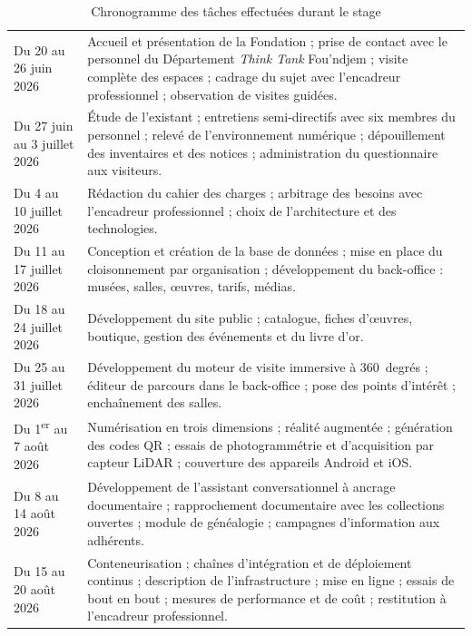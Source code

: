 \begin{table}[!ht]
\centering
\caption{Chronogramme des tâches effectuées durant le stage}
\label{tab:chronogramme}
\footnotesize
\begin{tabularx}{\textwidth}{|L{3.4cm}|X|}
\hline
{}
 &  \\ \hline
Du 20 au 26 juin 2026 &
Accueil et présentation de la Fondation ; prise de contact avec le personnel du
Département \emph{Think Tank} Fou'ndjem ; visite complète des espaces ; cadrage
du sujet avec l'encadreur professionnel ; observation de visites guidées. \\ \hline
Du 27 juin au 3 juillet 2026 &
Étude de l'existant ; entretiens semi-directifs avec six membres du personnel ;
relevé de l'environnement numérique ; dépouillement des inventaires et des
notices ; administration du questionnaire aux visiteurs. \\ \hline
Du 4 au 10 juillet 2026 &
Rédaction du cahier des charges ; arbitrage des besoins avec l'encadreur
professionnel ; choix de l'architecture et des technologies. \\ \hline
Du 11 au 17 juillet 2026 &
Conception et création de la base de données ; mise en place du cloisonnement
par organisation ; développement du back-office : musées, salles, œuvres,
tarifs, médias. \\ \hline
Du 18 au 24 juillet 2026 &
Développement du site public ; catalogue, fiches d'œuvres, boutique,
gestion des événements et du livre d'or. \\ \hline
Du 25 au 31 juillet 2026 &
Développement du moteur de visite immersive à 360~degrés ; éditeur de parcours
dans le back-office ; pose des points d'intérêt ; enchaînement des salles. \\ \hline
Du 1\textsuperscript{er} au 7 août 2026 &
Numérisation en trois dimensions ; réalité augmentée ; génération des codes QR ;
essais de photogrammétrie et d'acquisition par capteur LiDAR ; couverture des
appareils Android et iOS. \\ \hline
Du 8 au 14 août 2026 &
Développement de l'assistant conversationnel à ancrage documentaire ;
rapprochement documentaire avec les collections ouvertes ; module de généalogie ;
campagnes d'information aux adhérents. \\ \hline
Du 15 au 20 août 2026 &
Conteneurisation ; chaînes d'intégration et de déploiement continus ;
description de l'infrastructure ; mise en ligne ; essais de bout en bout ;
mesures de performance et de coût ; restitution à l'encadreur professionnel. \\ \hline
\end{tabularx}
\end{table}


